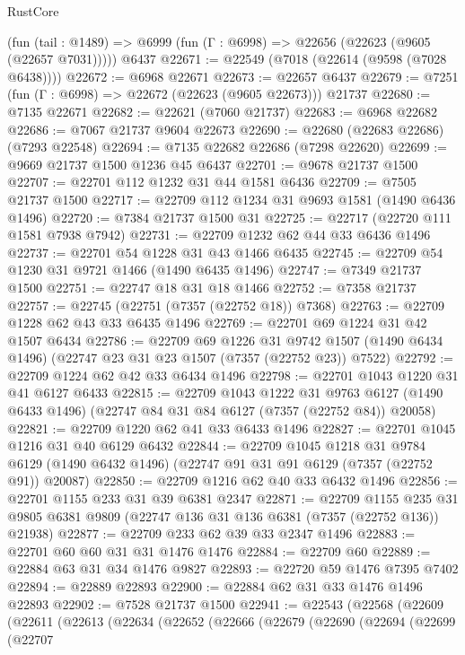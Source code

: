 \begin{lexlean}{RustCore}
\begin{coremodule}
    (fun (tail : @1489) => @6999 (fun (Γ : @6998) => @22656 (@22623 (@9605 (@22657 @7031)))))
    @6437
@22671 := @22549 (@7018 (@22614 (@9598 (@7028 @6438))))
@22672 := @6968 @22671
@22673 := @22657 @6437
@22679 := @7251 (fun (Γ : @6998) => @22672 (@22623 (@9605 @22673))) @21737
@22680 := @7135 @22671
@22682 := @22621 (@7060 @21737)
@22683 := @6968 @22682
@22686 := @7067 @21737 @9604 @22673
@22690 := @22680 (@22683 @22686) (@7293 @22548)
@22694 := @7135 @22682 @22686 (@7298 @22620)
@22699 := @9669 @21737 @1500 @1236 @45 @6437
@22701 := @9678 @21737 @1500
@22707 := @22701 @112 @1232 @31 @44 @1581 @6436
@22709 := @7505 @21737 @1500
@22717 := @22709 @112 @1234 @31 @9693 @1581 (@1490 @6436 @1496)
@22720 := @7384 @21737 @1500 @31
@22725 := @22717 (@22720 @111 @1581 @7938 @7942)
@22731 := @22709 @1232 @62 @44 @33 @6436 @1496
@22737 := @22701 @54 @1228 @31 @43 @1466 @6435
@22745 := @22709 @54 @1230 @31 @9721 @1466 (@1490 @6435 @1496)
@22747 := @7349 @21737 @1500
@22751 := @22747 @18 @31 @18 @1466
@22752 := @7358 @21737
@22757 := @22745 (@22751 (@7357 (@22752 @18)) @7368)
@22763 := @22709 @1228 @62 @43 @33 @6435 @1496
@22769 := @22701 @69 @1224 @31 @42 @1507 @6434
@22786 := @22709
    @69
    @1226
    @31
    @9742
    @1507
    (@1490 @6434 @1496)
    (@22747 @23 @31 @23 @1507 (@7357 (@22752 @23)) @7522)
@22792 := @22709 @1224 @62 @42 @33 @6434 @1496
@22798 := @22701 @1043 @1220 @31 @41 @6127 @6433
@22815 := @22709
    @1043
    @1222
    @31
    @9763
    @6127
    (@1490 @6433 @1496)
    (@22747 @84 @31 @84 @6127 (@7357 (@22752 @84)) @20058)
@22821 := @22709 @1220 @62 @41 @33 @6433 @1496
@22827 := @22701 @1045 @1216 @31 @40 @6129 @6432
@22844 := @22709
    @1045
    @1218
    @31
    @9784
    @6129
    (@1490 @6432 @1496)
    (@22747 @91 @31 @91 @6129 (@7357 (@22752 @91)) @20087)
@22850 := @22709 @1216 @62 @40 @33 @6432 @1496
@22856 := @22701 @1155 @233 @31 @39 @6381 @2347
@22871 := @22709
    @1155
    @235
    @31
    @9805
    @6381
    @9809
    (@22747 @136 @31 @136 @6381 (@7357 (@22752 @136)) @21938)
@22877 := @22709 @233 @62 @39 @33 @2347 @1496
@22883 := @22701 @60 @60 @31 @31 @1476 @1476
@22884 := @22709 @60
@22889 := @22884 @63 @31 @34 @1476 @9827
@22893 := @22720 @59 @1476 @7395 @7402
@22894 := @22889 @22893
@22900 := @22884 @62 @31 @33 @1476 @1496 @22893
@22902 := @7528 @21737 @1500
@22941 := @22543
    (@22568
      (@22609
        (@22611
          (@22613
            (@22634
              (@22652
                (@22666
                  (@22679
                    (@22690
                      (@22694
                        (@22699
                          (@22707

\end{coremodule}
\end{lexlean}
